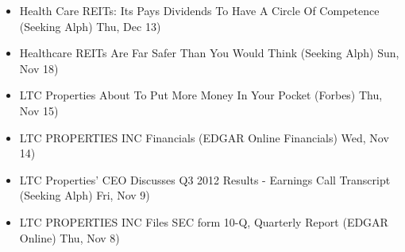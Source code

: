 \documentclass[11pt,asymmetric]{article}
\begin{document}
\begin{itemize}
\item Health Care REITs: Its Pays Dividends To Have A Circle Of Competence (Seeking Alph) Thu, Dec 13)
\item Healthcare REITs Are Far Safer Than You Would Think (Seeking Alph) Sun, Nov 18)
\item LTC Properties About To Put More Money In Your Pocket (Forbes) Thu, Nov 15)
\item LTC PROPERTIES INC Financials (EDGAR Online Financials) Wed, Nov 14)
\item LTC Properties' CEO Discusses Q3 2012 Results - Earnings Call Transcript (Seeking Alph) Fri, Nov 9)
\item LTC PROPERTIES INC Files SEC form 10-Q, Quarterly Report (EDGAR Online) Thu, Nov 8)
\end{itemize}
\end{document}
